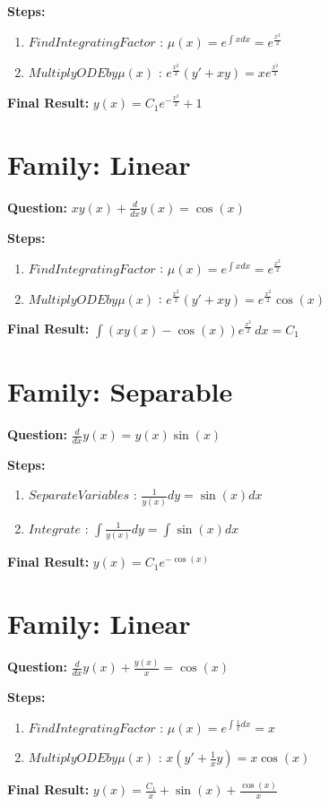 \documentclass{article}
\begin{document}
\textbf{Steps:}
\begin{enumerate}
\item $Find Integrating Factor$ :  $\mu(x) = e^{\int x dx} = e^{\frac{x^{2}}{2}}$
\item $Multiply ODE by \mu(x)$ :  $e^{\frac{x^{2}}{2}}(y' + xy) = x e^{\frac{x^{2}}{2}}$
\end{enumerate}
\textbf{Final Result:} $y{\left(x \right)} = C_{1} e^{- \frac{x^{2}}{2}} + 1$

\section*{Family: Linear}
\textbf{Question:} $x y{\left(x \right)} + \frac{d}{d x} y{\left(x \right)} = \cos{\left(x \right)}$

\textbf{Steps:}
\begin{enumerate}
\item $Find Integrating Factor$ :  $\mu(x) = e^{\int x dx} = e^{\frac{x^{2}}{2}}$
\item $Multiply ODE by \mu(x)$ :  $e^{\frac{x^{2}}{2}}(y' + xy) = e^{\frac{x^{2}}{2}} \cos{\left(x \right)}$
\end{enumerate}
\textbf{Final Result:} $\int \left(x y{\left(x \right)} - \cos{\left(x \right)}\right) e^{\frac{x^{2}}{2}}\, dx = C_{1}$

\section*{Family: Separable}
\textbf{Question:} $\frac{d}{d x} y{\left(x \right)} = y{\left(x \right)} \sin{\left(x \right)}$

\textbf{Steps:}
\begin{enumerate}
\item $Separate Variables$ :  $\frac{1}{y{\left(x \right)}} dy = \sin{\left(x \right)} dx$
\item $Integrate$ :  $\int \frac{1}{y{\left(x \right)}} dy = \int \sin{\left(x \right)} dx$
\end{enumerate}
\textbf{Final Result:} $y{\left(x \right)} = C_{1} e^{- \cos{\left(x \right)}}$

\section*{Family: Linear}
\textbf{Question:} $\frac{d}{d x} y{\left(x \right)} + \frac{y{\left(x \right)}}{x} = \cos{\left(x \right)}$

\textbf{Steps:}
\begin{enumerate}
\item $Find Integrating Factor$ :  $\mu(x) = e^{\int \frac{1}{x} dx} = x$
\item $Multiply ODE by \mu(x)$ :  $x(y' + \frac{1}{x}y) = x \cos{\left(x \right)}$
\end{enumerate}
\textbf{Final Result:} $y{\left(x \right)} = \frac{C_{1}}{x} + \sin{\left(x \right)} + \frac{\cos{\left(x \right)}}{x}$
\end{document}
